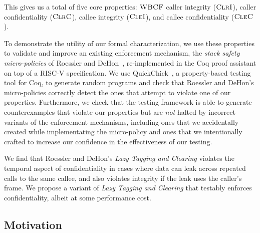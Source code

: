 This gives us a total of five core properties: \(\textnormal{\sc WBCF}\)
caller integrity (\(\textnormal{\sc ClrI}\)), caller confidentiality (\(\textnormal{\sc ClrC}\)),
callee integrity (\(\textnormal{\sc CleI}\)), and callee confidentiality (\(\textnormal{\sc CleC}\)).

To demonstrate the utility of our formal characterization, we use these
properties to validate and improve an existing enforcement mechanism, the
{\em stack safety micro-policies} of Roessler and DeHon~\cite{DBLP:conf/sp/RoesslerD18}, re-implemented
in the Coq proof assistant on top of a  RISC-V specification.  We
use QuickChick~\cite{Denes:VSL2014,Pierce:SF4}, a property-based testing
tool for Coq, to generate random programs and check
that Roessler and DeHon's micro-policies correctly detect the ones that
attempt to violate one of our properties. Furthermore, we
check that the testing framework is able to generate counterexamples
that violate our properties but are \emph{not} halted by incorrect
variants of the enforcement mechanisms, including ones that we accidentally created
while implementating the micro-policy and ones that we
intentionally crafted to increase our confidence in the effectiveness
of our testing.
%

We find that Roessler and DeHon's \emph{Lazy Tagging and Clearing}
violates the temporal aspect of confidentiality in
cases where data can leak across repeated calls to the same callee,
and also violates integrity if the leak uses the caller's frame. We
propose a variant of {\em Lazy Tagging and Clearing} that testably enforces
confidentiality, albeit at some performance cost.
%

\subsection{Motivation}


